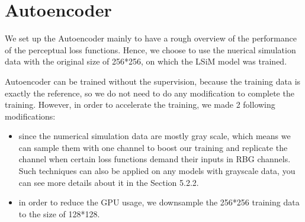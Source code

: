 \documentclass[a4paper,12pt,twoside]{report}
\begin{document}
\section{Autoencoder}
We set up the Autoencoder mainly to have a rough overview of the performance of the perceptual loss functions. Hence, we choose to use the nuerical simulation data with the original size of 256*256, on which the LSiM model was trained. 

Autoencoder can be trained without the supervision, because the training data is exactly the reference, so we do not need to do any modification to complete the training. However, in order to accelerate the training, we made 2 following modifications:
\begin{itemize}
\item since the numerical simulation data are mostly gray scale, which means we can sample them with one channel to boost our training and replicate the channel when certain loss functions demand their inputs in RBG channels. Such techniques can also be applied on any models with grayscale data, you can see more details about it in the Section 5.2.2.
\item in order to reduce the GPU usage, we downsample the 256*256 training data to the size of 128*128.

\end{itemize}
\end{document}
